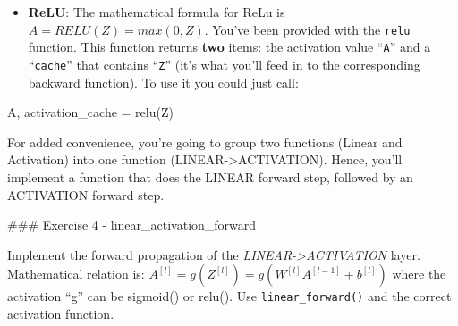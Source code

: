 \documentclass[11pt]{article}
\providecommand{\tightlist}{%
      \setlength{\itemsep}{0pt}\setlength{\parskip}{0pt}}
\newenvironment{Shaded}{}{}
\newcommand{\NormalTok}[1]{{#1}}
\newcommand{\OperatorTok}[1]{\textcolor[rgb]{0.40,0.40,0.40}{{#1}}}
\begin{document}
\begin{itemize}
\tightlist
\item
  \textbf{ReLU}: The mathematical formula for ReLu is
  \(A = RELU(Z) = max(0, Z)\). You've been provided with the
  \texttt{relu} function. This function returns \textbf{two} items: the
  activation value ``\texttt{A}'' and a ``\texttt{cache}'' that contains
  ``\texttt{Z}'' (it's what you'll feed in to the corresponding backward
  function). To use it you could just call:
\end{itemize}

\begin{Shaded}
\begin{Highlighting}[]
\NormalTok{A, activation\_cache }\OperatorTok{=}\NormalTok{ relu(Z)}
\end{Highlighting}
\end{Shaded}

    For added convenience, you're going to group two functions (Linear and
Activation) into one function (LINEAR-\textgreater ACTIVATION). Hence,
you'll implement a function that does the LINEAR forward step, followed
by an ACTIVATION forward step.

\#\#\# Exercise 4 - linear\_activation\_forward

Implement the forward propagation of the
\emph{LINEAR-\textgreater ACTIVATION} layer. Mathematical relation is:
\(A^{[l]} = g(Z^{[l]}) = g(W^{[l]}A^{[l-1]} +b^{[l]})\) where the
activation ``g'' can be sigmoid() or relu(). Use
\texttt{linear\_forward()} and the correct activation function.
\end{document}
